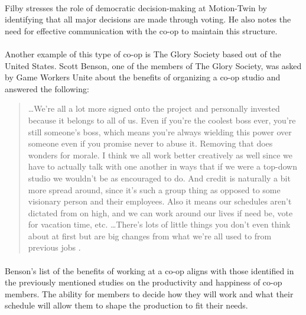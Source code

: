 \paragraph{} Filby stresses the role of democratic decision-making at Motion-Twin by identifying that all major decisions are made through voting. He also notes the need for effective communication with the co-op to maintain this structure.

\paragraph{} Another example of this type of co-op is The Glory Society based out of the United States. Scott Benson, one of the members of The Glory Society, was asked by Game Workers Unite about the benefits of organizing a co-op studio and answered the following:

\begin{quote}
    \item{} \ldots We're all a lot more signed onto the project and personally invested because it belongs to all of us. Even if you're the coolest boss ever, you're still someone's boss, which means you're always wielding this power over someone even if you promise never to abuse it. Removing that does wonders for morale. I think we all work better creatively as well since we have to actually talk with one another in ways that if we were a top-down studio we wouldn't be as encouraged to do. And credit is naturally a bit more spread around, since it's such a group thing as opposed to some visionary person and their employees. Also it means our schedules aren't dictated from on high, and we can work around our lives if need be, vote for vacation time, etc. \ldots There's lots of little things you don't even think about at first but are big changes from what we're all used to from previous jobs \autocite{game_workers_unite_worker_2021}.
\end{quote}

\paragraph{} Benson's list of the benefits of working at a co-op aligns with those identified in the previously mentioned studies on the productivity and happiness of co-op members. The ability for members to decide how they will work and what their schedule will allow them to shape the production to fit their needs.

